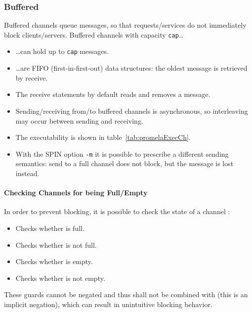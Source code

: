 			\subsubsection{Buffered}
				Buffered channels queue messages, so that requests/services do not immediately block clients/servers. Buffered channels with capacity \texttt{cap}\dots
				\begin{itemize}
					\item \dots can hold up to \texttt{cap} messages.
					\item \dots are FIFO (first-in-first-out) data structures: the oldest message is retrieved by receive.
					\item The receive statements by default reads and removes a message.
					\item Sending/receiving from/to buffered channels is asynchronous, so interleaving may occur between sending and receiving.
					\item The executability is shown in table~\ref{tab:promelaExecCh}.
					\item With the SPIN option \texttt{-m} it is possible to prescribe a different sending semantics: send to a full channel does not block, but the message is lost instead.
				\end{itemize}
			
				\paragraph{Checking Channels for being Full/Empty}
					In order to prevent blocking, it is possible to check the state of a channel :
					\begin{itemize}
						\item {}   \tabto{2cm} Checks whether  is full.
						\item {}  \tabto{2cm} Checks whether  is not full.
						\item {}  \tabto{2cm} Checks whether  is empty.
						\item {} \tabto{2cm} Checks whether  is not empty.
					\end{itemize}
					
					These guards cannot be negated and thus shall not be combined with  (this is an implicit negation), which can result in unintuitive blocking behavior.
				
